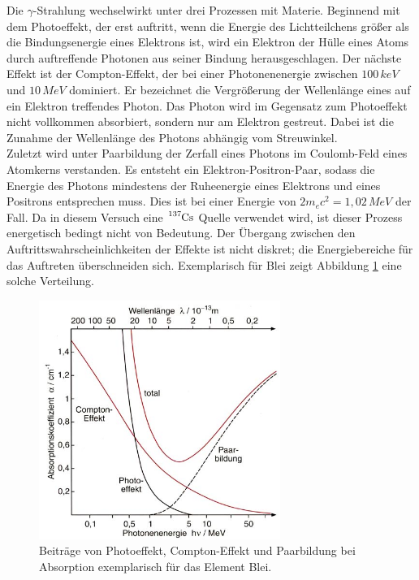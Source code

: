 Die $\gamma$-Strahlung wechselwirkt unter drei Prozessen mit Materie.
Beginnend mit dem Photoeffekt, der erst auftritt, wenn die Energie des Lichtteilchens größer als die Bindungsenergie eines Elektrons ist, wird ein Elektron der Hülle eines
Atoms durch auftreffende Photonen aus seiner Bindung herausgeschlagen.
Der nächste Effekt ist der Compton-Effekt, der bei einer Photonenenergie zwischen $100\, \si{keV}$ und $10\, \si{MeV}$ dominiert.
Er bezeichnet die Vergrößerung der Wellenlänge eines auf ein Elektron treffendes Photon.
Das Photon wird im Gegensatz zum Photoeffekt nicht vollkommen absorbiert, sondern nur am Elektron gestreut. Dabei ist die Zunahme der Wellenlänge des Photons
abhängig vom Streuwinkel.\\
Zuletzt wird unter Paarbildung der Zerfall eines Photons im Coulomb-Feld eines Atomkerns verstanden.
Es entsteht ein Elektron-Positron-Paar, sodass die Energie des Photons mindestens der Ruheenergie eines Elektrons und eines Positrons entsprechen muss.
Dies ist bei einer Energie von $2m_ec^2 = 1,02\, \si{MeV}$ der Fall.
Da in diesem Versuch eine $\ce{^{137}Cs}$ Quelle verwendet wird, ist dieser Prozess energetisch bedingt nicht von Bedeutung.
Der Übergang zwischen den Auftrittswahrscheinlichkeiten der Effekte ist nicht diskret; die Energiebereiche für das Auftreten überschneiden sich.
Exemplarisch für Blei zeigt Abbildung \ref{fig:effekte} eine solche Verteilung.

\begin{figure}[H]
  \centering
  \includegraphics[width=0.7\textwidth]{bilder/absorption.jpg}
  \caption{Beiträge von Photoeffekt, Compton-Effekt und Paarbildung bei Absorption exemplarisch für das Element Blei.\cite{effekte}}
  \label{fig:effekte}
\end{figure}

